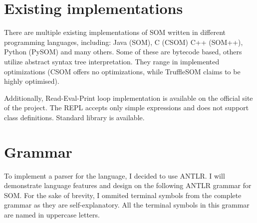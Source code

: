 \documentclass[thesis=M,english]{FITthesis}[2019/12/23]
\begin{document}
\section{Existing implementations}
There are multiple existing implementations of SOM written in different programming languages, including: Java (SOM), C (CSOM) C++ (SOM++), Python (PySOM) and
many others. Some of these are bytecode based, others utilize abstract syntax tree interpretation. They range in implemented optimizations (CSOM offers no 
optimizations, while TruffleSOM claims to be highly optimised).

Additionally, Read-Eval-Print loop implementation is available on the official site of the project. The REPL accepts only simple expressions and does
not support class definitions. Standard library is available. \cite{som-github}

\section{Grammar}
To implement a parser for the language, I decided to use ANTLR. I will demonstrate language features and design on the following ANTLR grammar
for SOM. For the sake of brevity, I ommited terminal symbols from the complete grammar as they are self-explanatory. All the terminal symbols
in this grammar are named in uppercase letters.
\end{document}

